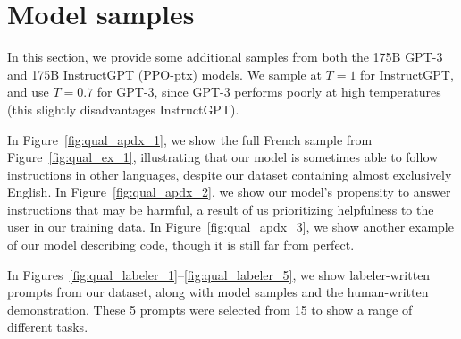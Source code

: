 \documentclass{article}
\begin{document}
\newpage
\section{Model samples}

In this section, we provide some additional samples from both the 175B GPT-3 and 175B InstructGPT (PPO-ptx) models. We sample at $T=1$ for InstructGPT, and use $T=0.7$ for GPT-3, since GPT-3 performs poorly at high temperatures (this slightly disadvantages InstructGPT). 

In Figure~\ref{fig:qual_apdx_1}, we show the full French sample from Figure~\ref{fig:qual_ex_1}, illustrating that our model is sometimes able to follow instructions in other languages, despite our dataset containing almost exclusively English. In Figure~\ref{fig:qual_apdx_2}, we show our model's propensity to answer instructions that may be harmful, a result of us prioritizing helpfulness to the user in our training data. In Figure~\ref{fig:qual_apdx_3}, we show another example of our model describing code, though it is still far from perfect.

In Figures~\ref{fig:qual_labeler_1}--\ref{fig:qual_labeler_5}, we show labeler-written prompts from our dataset, along with model samples and the human-written demonstration. These 5 prompts were selected from 15 to show a range of different tasks. 
\end{document}
